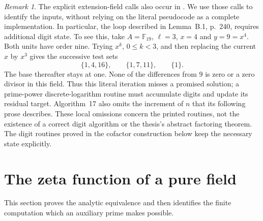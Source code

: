 \documentclass[11pt]{article}
\theoremstyle{definition}
\theoremstyle{remark}
\newtheorem{remark}[theorem]{Remark}
\begin{document}
\begin{remark}\label{rem:literal-prime-power-loop}
The explicit extension-field calls also occur in
\citet[Caltech dissertation, Appendix~B, Algorithm~17, p.~241,
lines~9 and~12]{Guo2017Thesis}. We use those calls to identify the
inputs, without relying on the literal pseudocode as a complete
implementation. In particular, the loop described in Lemma~B.1,
p.~240, requires additional digit state. To see this, take
\(A=\mathbb F_{19}\), \(\ell=3\), \(x=4\) and \(y=9=x^4\).
Both units have order nine. Trying \(x^k\), \(0\leq k<3\), and then
replacing the current \(x\) by \(x^3\) gives the successive test sets
\[
 \{1,4,16\},\qquad \{1,7,11\},\qquad \{1\}.
\]
The base thereafter stays at one. None of the differences from \(9\)
is zero or a zero divisor in this field. Thus this literal iteration
misses a promised solution; a prime-power discrete-logarithm routine
must accumulate digits and update its residual target.
Algorithm~17 also omits the increment of \(n\) that its following
prose describes. These local omissions concern the printed routines,
not the existence of a correct digit algorithm or the thesis's
abstract factoring theorem. The digit routines proved in
the cofactor construction below keep the necessary state explicitly.
\end{remark}

\section{The zeta function of a pure field}
This section proves the analytic equivalence and then identifies the
finite computation which an auxiliary prime makes possible.
\end{document}
